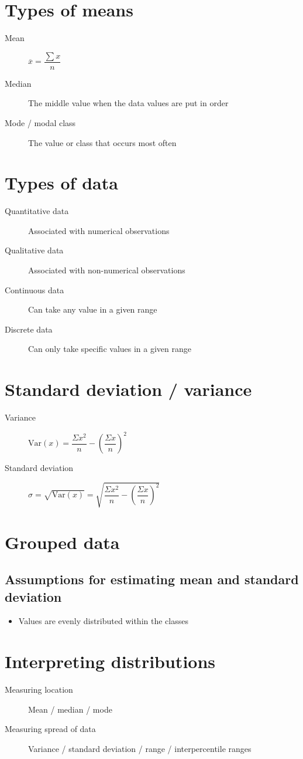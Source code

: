 \section{Types of means}
\begin{description}
	\item[Mean] $\overline{x}=\dfrac{\sum x}{n}$
	\item[Median] The middle value when the data values are put in order
	\item[Mode / modal class] The value or class that occurs most often
\end{description}

\section{Types of data}
\begin{description}
	\item[Quantitative data] Associated with numerical observations
	\item[Qualitative data] Associated with non-numerical observations
	\item[Continuous data] Can take any value in a given range
	\item[Discrete data] Can only take specific values in a given range
\end{description}

\section{Standard deviation / variance}
\begin{description}
	\item[Variance] $\mathrm{Var}(x)=\dfrac{\Sigma x^2}{n} - (\dfrac{\Sigma x}{n})^2$
	\item[Standard deviation] $\sigma=\sqrt{\mathrm{Var}(x)}=\sqrt{\dfrac{\Sigma x^2}{n} - (\dfrac{\Sigma x}{n})^2}$
\end{description}

\section{Grouped data}
\subsection{Assumptions for estimating mean and standard deviation}
\begin{itemize}
	\item Values are evenly distributed within the classes
\end{itemize}

\section{Interpreting distributions}
\begin{description}
	\item[Measuring location] Mean / median / mode
	\item[Measuring spread of data] Variance / standard deviation / range / interpercentile ranges
\end{description}
